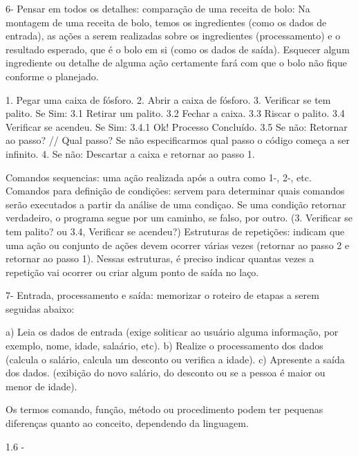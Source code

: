 6- Pensar em todos os detalhes: comparação de uma receita de bolo:
Na montagem de uma receita de bolo, temos os ingredientes (como os dados de entrada), as ações a serem realizadas sobre os
ingredientes (processamento) e o resultado esperado, que é o bolo em si (como os dados de saída). Esquecer algum ingrediente
ou detalhe de alguma ação certamente fará com que o bolo não fique conforme o planejado.

1. Pegar uma caixa de fósforo.
2. Abrir a caixa de fósforo.
3. Verificar se tem palito. Se Sim:
3.1 Retirar um palito.
3.2 Fechar a caixa.
3.3 Riscar o palito.
3.4 Verificar se acendeu. Se Sim:
3.4.1 Ok! Processo Concluído.
3.5 Se não: Retornar ao passo? // Qual passo? Se não especificarmos qual passo o código começa a ser infinito.
4. Se não: Descartar a caixa e retornar ao passo 1.

Comandos sequencias: uma ação realizada após a outra como 1-, 2-, etc.
Comandos para definição de condições: servem para determinar quais comandos serão executados a partir da análise de uma condiçao.
Se  uma condição retornar verdadeiro, o programa segue por um caminho, se falso, por outro. (3. Verificar se tem palito? ou 3.4, Verificar se
acendeu?)
Estruturas de repetições: indicam que uma ação ou conjunto de ações devem ocorrer várias vezes  (retornar ao passo 2 e retornar ao passo
1). Nessas estruturas, é preciso indicar quantas vezes a repetição vai ocorrer ou criar algum ponto de saída no laço.

7- Entrada, processamento e saída: memorizar o roteiro de etapas a serem seguidas abaixo:

a) Leia os dados de entrada (exige soliticar ao usuário alguma informação, por exemplo, nome, idade, salaário, etc).
b) Realize o processamento dos dados (calcula o salário, calcula um desconto ou verifica a idade).
c) Apresente a saída dos dados. (exibição do novo salário, do desconto ou se a pessoa é maior ou menor de idade).

Os termos comando, função, método ou
procedimento podem ter pequenas diferenças quanto ao conceito, dependendo da linguagem.

1.6 - 
